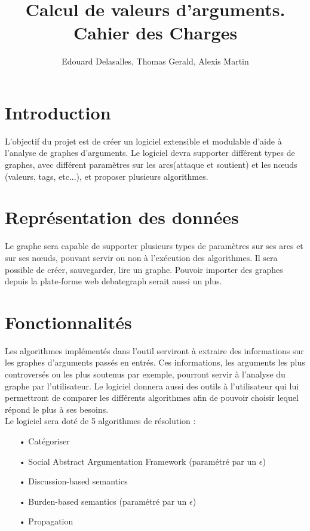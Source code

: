 \documentclass[a4paper, 11pt]{article}
\title{Calcul de valeurs d'arguments. Cahier des Charges}
\author{Edouard Delasalles, Thomas Gerald, Alexis Martin}
\begin{document}
\maketitle
\section*{Introduction}
L'objectif du projet est de créer un logiciel extensible et modulable d'aide à l'analyse de graphes d'arguments. Le logiciel devra supporter différent types de graphes, avec différent paramètres sur les arcs(attaque et soutient) et les nœuds (valeurs, tags, etc...), et proposer plusieurs algorithmes.

\section{Représentation des données}
Le graphe sera capable de supporter plusieurs types de paramètres sur ses arcs et sur ses nœuds, pouvant servir ou non à l'exécution des algorithmes. Il sera possible de créer, sauvegarder, lire un graphe. Pouvoir importer des graphes depuis la plate-forme web debategraph serait aussi un plus. \\

\section{Fonctionnalités}
Les algorithmes implémentés dans l'outil serviront à extraire des informations sur les graphes d'arguments passés en entrés. Ces informations, les arguments les plus controversés ou les plus soutenus par exemple, pourront servir à l'analyse du graphe par l'utilisateur. Le logiciel donnera aussi des outils à l'utilisateur qui lui permettront de comparer les différents algorithmes afin de pouvoir choisir lequel répond le plus à ses besoins. \\

Le logiciel sera doté de 5 algorithmes de résolution :
\begin{itemize}
\item[•]Catégoriser
\item[•]Social Abstract Argumentation Framework (paramétré par un $\epsilon$)
\item[•]Discussion-based semantics
\item[•]Burden-based semantics (paramétré par un $\epsilon$)
\item[•]Propagation\\
\end{itemize}
\end{document}

